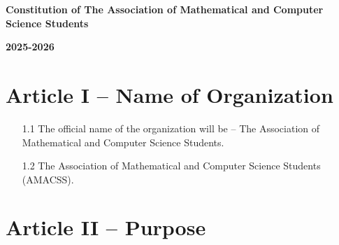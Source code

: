 \documentclass[12pt,a4paper]{article}
\begin{document}
\begin{center}
{\Large\textbf{Constitution of The Association of Mathematical and Computer Science Students}}

\vspace{0.5cm}
{\large\textbf{2025-2026}}
\end{center}

\vspace{1cm}

\section*{Article I – Name of Organization}

\begin{enumerate}
\item[1.1] The official name of the organization will be – The Association of Mathematical and Computer Science Students.

\item[1.2] The Association of Mathematical and Computer Science Students (AMACSS).
\end{enumerate}

\section*{Article II – Purpose}
\end{document}
